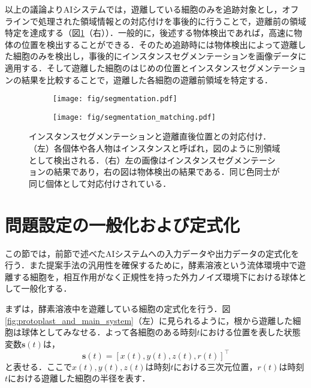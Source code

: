     以上の議論よりAIシステムでは，遊離している細胞のみを追跡対象とし，オフラインで処理された領域情報との対応付けを事後的に行うことで，遊離前の領域特定を達成する（図\ref{fig:instance_segmentation_and_matching}（右））．一般的に，後述する物体検出であれば，高速に物体の位置を検出することができる．そのため追跡時には物体検出によって遊離した細胞のみを検出し，事後的にインスタンスセグメンテーションを画像データに適用する．そして遊離した細胞のはじめの位置とインスタンスセグメンテーションの結果を比較することで，遊離した各細胞の遊離前領域を特定する．

    \begin{figure}[t]
        \centering
        \begin{subfigure}[b]{.45\linewidth}
            \centering
            \texttt{[image: fig/segmentation.pdf]}
        \end{subfigure}
        \hfill
        \begin{subfigure}[b]{.45\linewidth}
            \centering
            \texttt{[image: fig/segmentation\_matching.pdf]}
        \end{subfigure}
        \caption[インスタンスセグメンテーションと遊離直後位置との対応付け]{インスタンスセグメンテーションと遊離直後位置との対応付け．（左）各個体や各人物はインスタンスと呼ばれ，図のように別領域として検出される．（右）左の画像はインスタンスセグメンテーションの結果であり，右の図は物体検出の結果である．同じ色同士が同じ個体として対応付けされている．}
        \label{fig:instance_segmentation_and_matching}
    \end{figure}

\section{問題設定の一般化および定式化}
\label{sec:setting}

この節では，前節で述べたAIシステムへの入力データや出力データの定式化を行う．また提案手法の汎用性を確保するために，酵素溶液という流体環境中で遊離する細胞を，相互作用がなく正規性を持った外力ノイズ環境下における球体として一般化する．

まずは，酵素溶液中を遊離している細胞の定式化を行う．図\ref{fig:protoplast_and_main_system}（左）に見られるように，根から遊離した細胞は球体としてみなせる．よって各細胞のある時刻$t$における位置を表した状態変数$\bm{s}(t)$は，
\begin{equation}
    \label{eq:continous_state_vecotr}
    \bm{s}(t) = \left[x(t), y(t), z(t), r(t)\right]^{\top}
\end{equation}
と表せる．ここで$x(t),y(t),z(t)$は時刻$t$における三次元位置，$r(t)$は時刻$t$における遊離した細胞の半径を表す．

